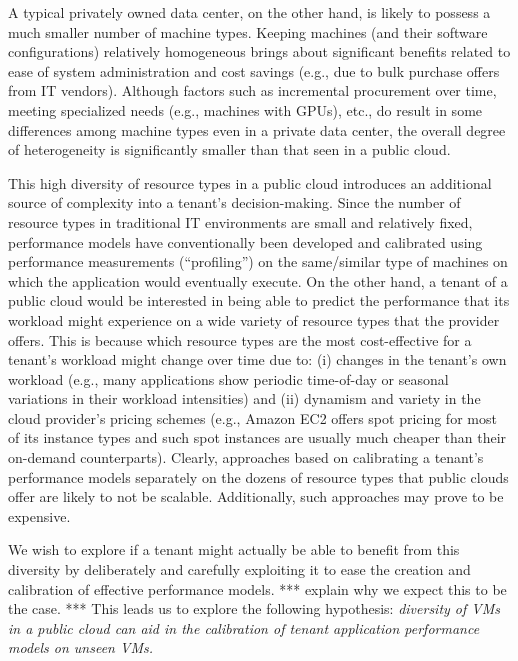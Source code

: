 A typical privately owned data center, on the other hand, is likely to possess a much smaller number of machine types. Keeping machines (and their software configurations) relatively homogeneous brings about significant benefits related to ease of system administration and cost savings (e.g., due to bulk purchase offers from IT vendors). Although factors such as incremental procurement over time, meeting specialized needs (e.g., machines with GPUs), etc.,  do result in some differences among machine types even in a private data center, the overall degree of heterogeneity is significantly smaller than that seen in a  public cloud.

 

This high diversity of resource types in a public cloud introduces an additional source of complexity into a tenant's decision-making. Since the number of resource types in traditional IT environments are small and relatively fixed, performance models have conventionally been developed and calibrated using performance measurements (``profiling'') on the same/similar type of machines on which the application would eventually execute. On the other hand, a tenant of a public cloud would be interested in being able to predict the performance that its workload might experience on a wide variety of resource types that the provider offers. This is because which resource types are the most cost-effective for a tenant's workload might change over time due to: (i) changes in the tenant's own workload (e.g., many applications show periodic time-of-day or seasonal variations in their workload intensities) and (ii) dynamism and variety in the cloud provider's pricing schemes (e.g., Amazon EC2 offers spot pricing for most of its instance types and such spot instances are usually much cheaper than their on-demand counterparts). Clearly, approaches based on calibrating a tenant's performance models separately on the dozens of resource types that public clouds offer are likely to not be scalable. Additionally, such approaches may prove to be expensive. 

We wish to explore if a tenant might actually be able to benefit from this diversity by deliberately and carefully exploiting it to ease the creation and calibration of effective performance models. *** explain why we expect this to be the case. *** This leads us to explore the following hypothesis: {\it diversity of VMs in a public cloud can aid in the calibration of tenant application performance models on unseen VMs.} 

